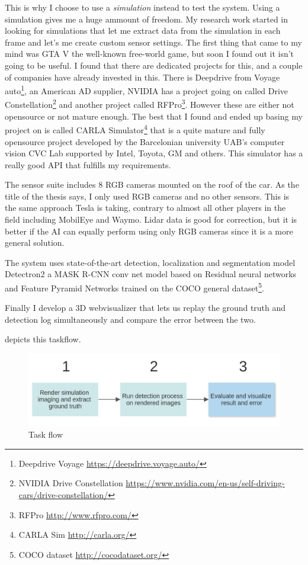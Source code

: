 This is why I choose to use a \emph{simulation} instead to test the system.
Using a simulation gives me a huge ammount of freedom. My research work started
in looking for simulations that let me extract data from the simulation in each
frame and let's me create custom sensor settings. The first thing that came to
my mind was GTA V the well-known free-world game, but soon I found out it isn't
going to be useful. I found that there are dedicated projects for this, and a
couple of companies have already invested in this. There is Deepdrive from
Voyage auto\footnote{Deepdrive Voyage \url{https://deepdrive.voyage.auto/}}, an
American AD supplier, NVIDIA has a project going on called Drive
Constellation\footnote{NVIDIA Drive Constellation
    \url{https://www.nvidia.com/en-us/self-driving-cars/drive-constellation/}} and
another project called RFPro\footnote{RFPro \url{http://www.rfpro.com/}}.
However these are either not opensource or not mature enough. The best that I
found and ended up basing my project on is called CARLA Simulator\footnote{CARLA
    Sim \url{http://carla.org/}}\cite{Dosovitskiy17} that is a quite mature and fully opensource project
developed by the Barcelonian university UAB's computer vision CVC Lab supported
by Intel, Toyota, GM and others. This simulator has a really good API that
fulfills my requirements.

The sensor suite includes 8 RGB cameras mounted on the roof of the car. As the
title of the thesis says, I only used RGB cameras and no other sensors. This is
the same approach Tesla is taking, contrary to almost all other players in the
field including MobilEye and Waymo. Lidar data is good for correction, but it is
better if the AI can equally perform using only RGB cameras since it is a more
general solution.

The system uses state-of-the-art detection, localization and segmentation model
Detectron2 \cite{wu2019detectron2} a MASK R-CNN conv net model based on Residual
neural networks and Feature Pyramid Networks trained on the COCO general
dataset\footnote{COCO dataset \url{http://cocodataset.org/}}.

Finally I develop a 3D webvisualizer that lets us replay the ground truth and
detection log simultaneously and compare the error between the two.

 depicts this taskflow.

\begin{figure}[!ht]
    \centering
    \includegraphics[width=150mm, keepaspectratio]{figures/flowchart.png}
    \caption{Task flow}
    \label{fig:flow}
\end{figure}

